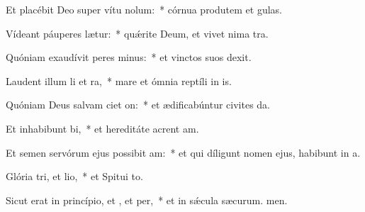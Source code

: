 \item Et placébit Deo super vítu nolum:~* córnua produtem et gulas.
\item Vídeant páuperes  lætur:~* quǽrite Deum, et vivet nima tra.
\item Quóniam exaudívit peres minus:~* et vinctos suos  dexit.
\item Laudent illum li et ra,~* mare et ómnia reptíli in is.
\item Quóniam Deus salvam ciet on:~* et ædificabúntur civites da.
\item Et inhabibunt bi,~* et hereditáte acrent am.
\item Et semen servórum ejus possibit am:~* et qui díligunt nomen ejus, habibunt in a.
\item Glória tri, et lio,~* et Spitui to.
\item Sicut erat in princípio, et , et per,~* et in sǽcula sæcurum. men.
